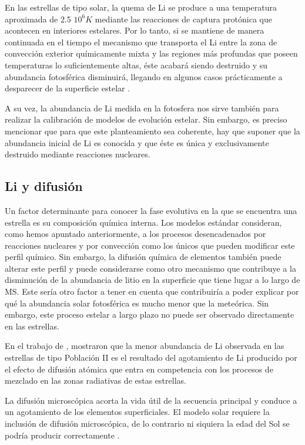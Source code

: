 En las estrellas de tipo solar, la quema de Li se produce a una temperatura aproximada de 2.5 $10^{6} K$ mediante las reacciones de captura protónica que acontecen en interiores estelares. Por lo tanto, si se mantiene de manera continuada en el tiempo el mecanismo que transporta el Li entre la zona de convección exterior químicamente mixta y las regiones más profundas que poseen temperaturas lo suficientemente altas, éste acabará siendo destruido y su abundancia fotosférica disminuirá, llegando en algunos casos prácticamente a desparecer de la superficie estelar \cite{DelgadoMena2014}.\par

A su vez, la abundancia de Li medida en la fotosfera nos sirve también para realizar la calibración de modelos de evolución estelar. Sin embargo, es preciso mencionar que para que este planteamiento sea coherente, hay que suponer que la abundancia inicial de Li es conocida y que éste es única y exclusivamente destruido mediante reacciones nucleares.\par

\subsection{Li y difusión}
Un factor determinante para conocer la fase evolutiva en la que se encuentra una estrella es su composición química interna. Los modelos estándar consideran, como hemos apuntado anteriormente, a los procesos desencadenados por reacciones nucleares y por convección como los únicos que pueden modificar este perfil químico. Sin embargo, la difusión química de elementos también puede alterar este perfil y puede considerarse como otro mecanismo que contribuye a la disminución de la abundancia de litio en la superficie que tiene lugar a lo largo de MS. Este sería otro factor a tener en cuenta que contribuiría a poder explicar por qué la abundancia solar fotosférica es mucho menor que la meteórica. Sin embargo, este proceso estelar a largo plazo no puede ser observado directamente en las estrellas.\par

En el trabajo de \cite{Richard2004}, mostraron que la menor abundancia de Li observada en las estrellas de tipo Población II es el resultado del agotamiento de Li producido por el efecto de difusión atómica que entra en competencia con los procesos de mezclado en las zonas radiativas de estas estrellas.\par

La difusión microscópica acorta la vida útil de la secuencia principal y conduce a un agotamiento de los elementos superficiales. El modelo solar requiere la inclusión de difusión microscópica, de lo contrario ni siquiera la edad del Sol se podría producir correctamente \cite{Thoul1993}.\par

